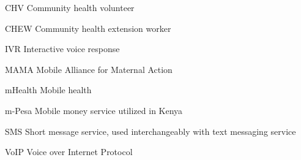 \abbreviations


%
%
%
%

\begin{symbollist}
	\item[CHV] Community health volunteer
	\item[CHEW] Community health extension worker
	\item[IVR] Interactive voice response
	\item[MAMA] Mobile Alliance for Maternal Action
	\item[mHealth] Mobile health
	\item[m-Pesa] Mobile money service utilized in Kenya
	\item[SMS] Short message service, used interchangeably with text messaging service
	\item[VoIP] Voice over Internet Protocol
\end{symbollist}
